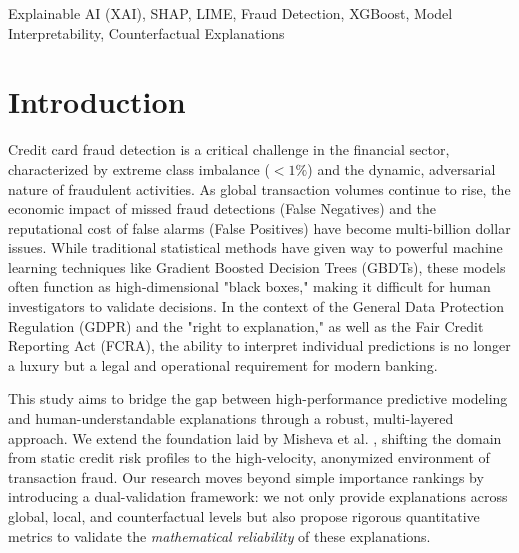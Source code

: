 \documentclass[conference]{IEEEtran}
\begin{document}
\begin{IEEEkeywords}
Explainable AI (XAI), SHAP, LIME, Fraud Detection, XGBoost, Model Interpretability, Counterfactual Explanations
\end{IEEEkeywords}

\section{Introduction}
Credit card fraud detection is a critical challenge in the financial sector, characterized by extreme class imbalance ($<1\%$) and the dynamic, adversarial nature of fraudulent activities. As global transaction volumes continue to rise, the economic impact of missed fraud detections (False Negatives) and the reputational cost of false alarms (False Positives) have become multi-billion dollar issues. While traditional statistical methods have given way to powerful machine learning techniques like Gradient Boosted Decision Trees (GBDTs), these models often function as high-dimensional "black boxes," making it difficult for human investigators to validate decisions. In the context of the General Data Protection Regulation (GDPR) and the "right to explanation," as well as the Fair Credit Reporting Act (FCRA), the ability to interpret individual predictions is no longer a luxury but a legal and operational requirement for modern banking.

This study aims to bridge the gap between high-performance predictive modeling and human-understandable explanations through a robust, multi-layered approach. We extend the foundation laid by Misheva et al. \cite{b1}, shifting the domain from static credit risk profiles to the high-velocity, anonymized environment of transaction fraud. Our research moves beyond simple importance rankings by introducing a dual-validation framework: we not only provide explanations across global, local, and counterfactual levels but also propose rigorous quantitative metrics to validate the \textit{mathematical reliability} of these explanations.
\end{document}
